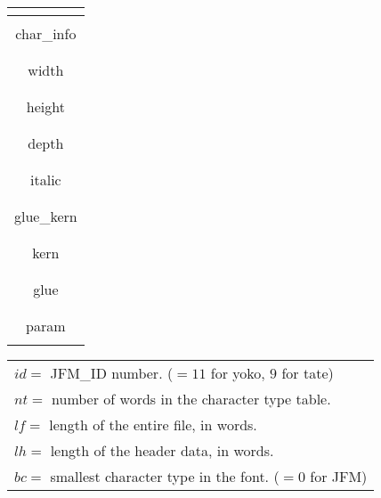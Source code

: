 \documentclass[twoside]{jarticle}
\begin{document}
{{\begin{table}[h]
\begin{minipage}[b]{2in}
\begin{tabular}{|c|c|}
\multicolumn{2}{|c|}{}\\ \hline
\multicolumn{2}{|c|}{}\\
\multicolumn{2}{|c|}{char\_info} \\
\multicolumn{2}{|c|}{}\\ \hline
\multicolumn{2}{|c|}{}\\
\multicolumn{2}{|c|}{width} \\
\multicolumn{2}{|c|}{}\\ \hline
\multicolumn{2}{|c|}{}\\
\multicolumn{2}{|c|}{height} \\
\multicolumn{2}{|c|}{}\\ \hline
\multicolumn{2}{|c|}{}\\
\multicolumn{2}{|c|}{depth} \\
\multicolumn{2}{|c|}{}\\ \hline
\multicolumn{2}{|c|}{}\\
\multicolumn{2}{|c|}{italic} \\
\multicolumn{2}{|c|}{}\\ \hline
\multicolumn{2}{|c|}{}\\
\multicolumn{2}{|c|}{glue\_kern} \\
\multicolumn{2}{|c|}{}\\ \hline
\multicolumn{2}{|c|}{}\\
\multicolumn{2}{|c|}{kern} \\
\multicolumn{2}{|c|}{}\\ \hline
\multicolumn{2}{|c|}{}\\
\multicolumn{2}{|c|}{glue} \\
\multicolumn{2}{|c|}{}\\ \hline
\multicolumn{2}{|c|}{}\\
\multicolumn{2}{|c|}{param} \\
\multicolumn{2}{|c|}{}\\ \hline
\end{tabular}
\end{minipage}
\begin{minipage}[b]{3.3in}
\noindent
\begin{tabular}{l}
$id=$ JFM\_ID number. ($=11$ for yoko, $9$ for tate) \\
$nt=$ number of words in the character type table. \\
$lf=$ length of the entire file, in words. \\
$lh=$ length of the header data, in words. \\
$bc=$ smallest character type in the font. ($=0$ for JFM) \\

\end{tabular}
\end{minipage}
\end{table}}}
\end{document}
